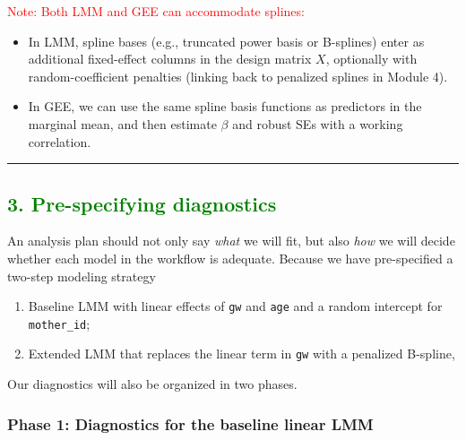 \documentclass[
  letterpaper,
  DIV=11,
  numbers=noendperiod]{scrreprt}
\providecommand{\tightlist}{%
  \setlength{\itemsep}{0pt}\setlength{\parskip}{0pt}}\usepackage{longtable,booktabs,array}
\begin{document}
\textcolor{red}{Note: Both LMM and GEE can accommodate splines:}

\begin{itemize}
\item
  In LMM, spline bases (e.g., truncated power basis or B-splines) enter
  as additional fixed-effect columns in the design matrix \(X\),
  optionally with random-coefficient penalties (linking back to
  penalized splines in Module 4).
\item
  In GEE, we can use the same spline basis functions as predictors in
  the marginal mean, and then estimate \(\beta\) and robust SEs with a
  working correlation.
\end{itemize}

\begin{center}\rule{0.5\linewidth}{0.5pt}\end{center}

\hypertarget{section-61}{%
\subsection*{\texorpdfstring{\textcolor{green}{3. Pre-specifying diagnostics}}{}}\label{section-61}}

An analysis plan should not only say \emph{what} we will fit, but also
\emph{how} we will decide whether each model in the workflow is
adequate. Because we have pre-specified a two-step modeling strategy

\begin{enumerate}
\def\labelenumi{\arabic{enumi}.}
\tightlist
\item
  Baseline LMM with linear effects of \texttt{gw} and \texttt{age} and a
  random intercept for \texttt{mother\_id};
\item
  Extended LMM that replaces the linear term in \texttt{gw} with a
  penalized B-spline,
\end{enumerate}

Our diagnostics will also be organized in two phases.

\hypertarget{phase-1-diagnostics-for-the-baseline-linear-lmm}{%
\subsubsection*{Phase 1: Diagnostics for the baseline linear
LMM}\label{phase-1-diagnostics-for-the-baseline-linear-lmm}}
\end{document}
